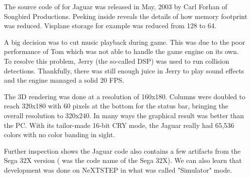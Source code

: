 \vspace{-12pt}
The source code of \doom{} for Jaguar was released in May, 2003 by Carl Forhan of Songbird Productions. Peeking inside reveals the details of how memory footprint was reduced. Visplane storage for example was reduced from 128 to 64.\\
\par
{}
\par
A big decision was to cut music playback during game. This was due to the poor performance of Tom which was not able to handle the game engine on its own. To resolve this problem, Jerry (the so-called DSP) was used to run collision detections. Thankfully, there was still enough juice in Jerry to play sound effects and the engine managed a solid 20 FPS.\\
\par
The 3D rendering was done at a resolution of 160x180. Columns were doubled to reach 320x180 with 60 pixels at the bottom for the status bar, bringing the overall resolution to 320x240. In many ways the graphical result was better than the PC. With its tailor-made 16-bit CRY mode, the Jaguar really had 65,536 colors with no color banding in sight.




\par
Further inspection shows the Jaguar code also contains a few artifacts from the Sega 32X version ( was the code name of the Sega 32X). We can also learn that development was done on NeXTSTEP in what was called "Simulator" mode.\\
\par
{}
\par

